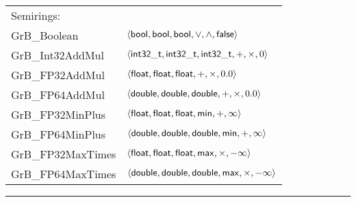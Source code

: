 \begin{table}[bt]
\begin{center}
\begin{tabular}{|l|l|}
		Semirings:	& 	\\
				{\sf GrB\_Boolean}	 \rule{0pt}{3ex}	& $\left\langle {\sf bool}, {\sf bool}, {\sf bool}, \vee, \wedge, {\sf false} \right\rangle$ \\
                {\sf GrB\_Int32AddMul}	& $\left\langle {\sf int32\_t}, {\sf int32\_t}, {\sf int32\_t}, +, \times, 0 \right\rangle$ \\
				{\sf GrB\_FP32AddMul}		& $\left\langle {\sf float}, {\sf float}, {\sf float}, +, \times, 0.0 \right\rangle$ \\ 
				{\sf GrB\_FP64AddMul}		& $\left\langle {\sf double}, {\sf double}, {\sf double}, +, \times, 0.0 \right\rangle$ \\ 
                {\sf GrB\_FP32MinPlus}	& $\left\langle {\sf float}, {\sf float}, {\sf float}, {\sf min}, +, \infty \right\rangle$ \\ 
                {\sf GrB\_FP64MinPlus}	& $\left\langle {\sf double}, {\sf double}, {\sf double}, {\sf min}, +, \infty \right\rangle$ \\ 
                {\sf GrB\_FP32MaxTimes}	& $\left\langle {\sf float}, {\sf float}, {\sf float}, {\sf max}, \times, -\infty \right\rangle$ \\ 
                {\sf GrB\_FP64MaxTimes}	& $\left\langle {\sf double}, {\sf double}, {\sf double}, {\sf max}, \times, -\infty \right\rangle$ \\\hline
	\end{tabular}
	\end{center}
	\hrule
\end{table}
